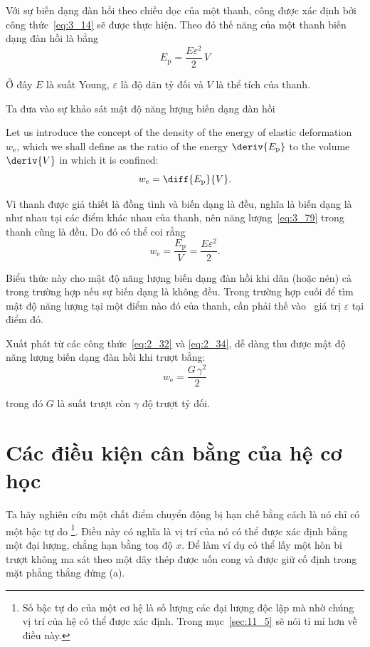 Với sự biến dạng đàn hồi theo chiều dọc của một thanh, công được xác định bởi công thức~\eqref{eq:3_14} sẽ được thực hiện. Theo đó thế năng của một thanh biến dạng đàn hồi là bằng
\begin{equation}\label{eq:3_79}
E_{\text{p}} = \frac{E\varepsilon^2}{2}\,V
\end{equation}

\noindent
Ở đây $E$ là suất Young, $\varepsilon$ là độ dãn tỷ đối và $V$ là thể tích của thanh.

Ta đưa vào sự khảo sát mật độ năng lượng biến dạng đàn hồi 

Let us introduce the concept of the density of the energy of elastic deformation $w_{\text{e}}$, which we shall define as the ratio of the energy $\deriv{E_{\text{p}}}$ to the volume $\deriv{V}$ in which it is confined:
\begin{equation}\label{eq:3_80}
w_{\text{e}} = \diff{E_{\text{p}}}{V}.
\end{equation}

\noindent
Vì thanh được giả thiết là đồng tình và biến dạng là đều, nghĩa là biến dạng là như nhau tại các điểm khác nhau của thanh, nên năng lượng~\eqref{eq:3_79} trong thanh cũng là đều. Do đó có thể coi rằng 
\begin{equation}\label{eq:3_81}
w_{\text{e}} = \frac{E_{\text{p}}}{V} = \frac{E\varepsilon^2}{2}.
\end{equation}

\noindent
Biểu thức này cho mật độ năng lượng biến dạng đàn hồi khi dãn (hoặc nén) cả trong trường hợp nếu sự biến dạng là không đều. Trong trường hợp cuối để tìm mật độ năng lượng tại một điểm nào đó của thanh, cần phải thế vào~ giá trị $\varepsilon$ tại điểm đó.

Xuất phát từ các công thức~\eqref{eq:2_32} và \eqref{eq:2_34}, dễ dàng thu được mật độ năng lượng biến dạng đàn hồi khi trượt bằng: 
\begin{equation}\label{eq:3_82}
w_{\text{e}} = \frac{G\,\gamma^2}{2}
\end{equation}

\noindent
trong đó $G$ là suất trượt còn $\gamma$ độ trượt tỷ đối.

\section{Các điều kiện cân bằng của hệ cơ học}\label{sec:3_9}

Ta hãy nghiên cứu một chất điểm chuyển động bị hạn chế bằng cách là nó chỉ có một bậc tự do \footnote{Số bậc tự do của một cơ hệ là số lượng các đại lượng độc lập mà nhờ chúng vị trí của hệ có thể được xác định. Trong mục~\ref{sec:11_5} sẽ nói tỉ mỉ hơn về điều này.}. Điều này có nghĩa là vị trí của nó có thể được xác định bằng một đại lượng, chẳng hạn bằng toạ độ $x$. Để làm ví dụ có thể lấy một hòn bi trượt không ma sát theo một dây thép được uốn cong và được giữ cố định trong mặt phẳng thẳng đứng (a).

